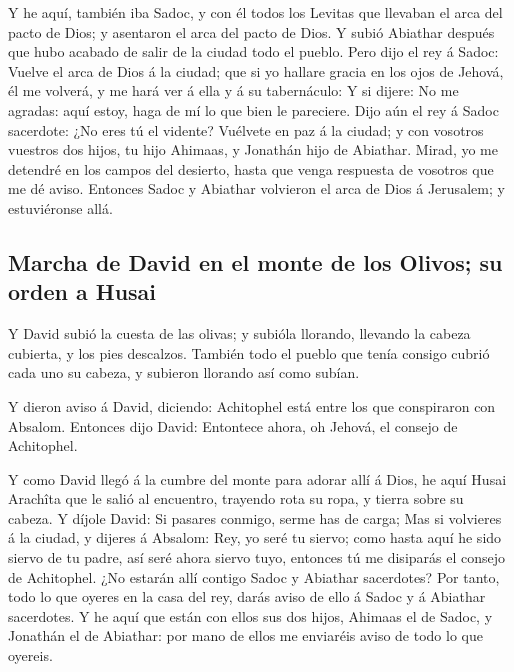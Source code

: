  Y he aquí, también iba Sadoc, y con él todos los Levitas
que llevaban el arca del pacto de Dios; y asentaron el arca del pacto de
Dios. Y subió Abiathar después que hubo acabado de salir de la ciudad
todo el pueblo.  Pero dijo el rey á Sadoc: Vuelve el arca
de Dios á la ciudad; que si yo hallare gracia en los ojos de Jehová, él
me volverá, y me hará ver á ella y á su tabernáculo:  Y si
dijere: No me agradas: aquí estoy, haga de mí lo que bien le pareciere.
 Dijo aún el rey á Sadoc sacerdote: ¿No eres tú el vidente?
Vuélvete en paz á la ciudad; y con vosotros vuestros dos hijos, tu hijo
Ahimaas, y Jonathán hijo de Abiathar.  Mirad, yo me
detendré en los campos del desierto, hasta que venga respuesta de
vosotros que me dé aviso.  Entonces Sadoc y Abiathar
volvieron el arca de Dios á Jerusalem; y estuviéronse allá.

\hypertarget{marcha-de-david-en-el-monte-de-los-olivos-su-orden-a-husai}{%
\subsection{Marcha de David en el monte de los Olivos; su orden a
Husai}\label{marcha-de-david-en-el-monte-de-los-olivos-su-orden-a-husai}}

 Y David subió la cuesta de las olivas; y subióla llorando,
llevando la cabeza cubierta, y los pies descalzos. También todo el
pueblo que tenía consigo cubrió cada uno su cabeza, y subieron llorando
así como subían.

 Y dieron aviso á David, diciendo: Achitophel está entre
los que conspiraron con Absalom. Entonces dijo David: Entontece ahora,
oh Jehová, el consejo de Achitophel.

 Y como David llegó á la cumbre del monte para adorar allí
á Dios, he aquí Husai Arachîta que le salió al encuentro, trayendo rota
su ropa, y tierra sobre su cabeza.  Y díjole David: Si
pasares conmigo, serme has de carga;  Mas si volvieres á la
ciudad, y dijeres á Absalom: Rey, yo seré tu siervo; como hasta aquí he
sido siervo de tu padre, así seré ahora siervo tuyo, entonces tú me
disiparás el consejo de Achitophel.  ¿No estarán allí
contigo Sadoc y Abiathar sacerdotes? Por tanto, todo lo que oyeres en la
casa del rey, darás aviso de ello á Sadoc y á Abiathar sacerdotes.
 Y he aquí que están con ellos sus dos hijos, Ahimaas el de
Sadoc, y Jonathán el de Abiathar: por mano de ellos me enviaréis aviso
de todo lo que oyereis.

